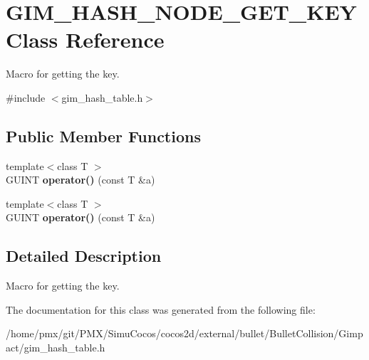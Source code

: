\hypertarget{classGIM__HASH__NODE__GET__KEY}{}\section{G\+I\+M\+\_\+\+H\+A\+S\+H\+\_\+\+N\+O\+D\+E\+\_\+\+G\+E\+T\+\_\+\+K\+EY Class Reference}
\label{classGIM__HASH__NODE__GET__KEY}


Macro for getting the key.  




{\ttfamily \#include $<$gim\+\_\+hash\+\_\+table.\+h$>$}

\subsection*{Public Member Functions}
\begin{DoxyCompactItemize}
\item 
\mbox{\label{classGIM__HASH__NODE__GET__KEY_a811ed67fdb924c58ec519c9fb8bdbec9}} 
{\footnotesize template$<$class T $>$ }\\G\+U\+I\+NT {\bfseries operator()} (const T \&a)
\item 
\mbox{\label{classGIM__HASH__NODE__GET__KEY_a811ed67fdb924c58ec519c9fb8bdbec9}} 
{\footnotesize template$<$class T $>$ }\\G\+U\+I\+NT {\bfseries operator()} (const T \&a)
\end{DoxyCompactItemize}


\subsection{Detailed Description}
Macro for getting the key. 

The documentation for this class was generated from the following file\+:\begin{DoxyCompactItemize}
\item 
/home/pmx/git/\+P\+M\+X/\+Simu\+Cocos/cocos2d/external/bullet/\+Bullet\+Collision/\+Gimpact/gim\+\_\+hash\+\_\+table.\+h\end{DoxyCompactItemize}
